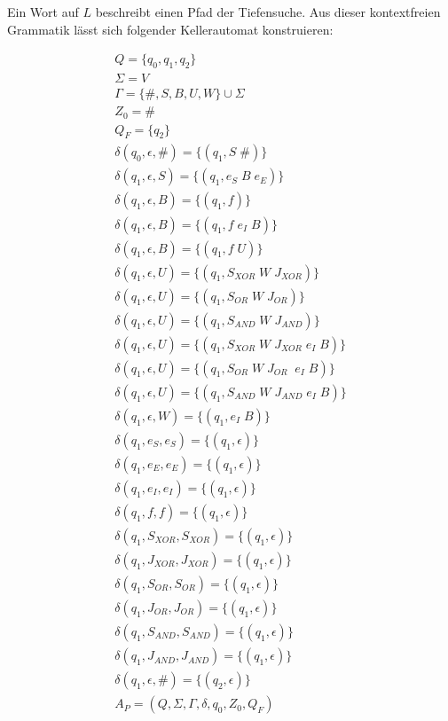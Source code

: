 \noindent Ein Wort auf $L$ beschreibt einen Pfad der Tiefensuche.
Aus dieser kontextfreien Grammatik lässt sich folgender Kellerautomat konstruieren: \cite{hopcroft_einfuhrung_nodate}

\begin{align}
    Q = \{q_0, q_1, q_2\} \\
    \Sigma =  V\\
    \Gamma = \{\#, S, B, U, W\} \cup \Sigma \\
    Z_0 = \# \\
    Q_F = \{q_2\} \\
    \delta(q_0, \epsilon, \#) = \{(q_1, S\; \#)\} \\
    \delta(q_1, \epsilon, S) = \{(q_1, e_S\; B\; e_E)\} \\
    \delta(q_1, \epsilon, B) = \{(q_1, f)\} \\
    \delta(q_1, \epsilon, B) = \{(q_1, f\; e_I \; B)\} \\
    \delta(q_1, \epsilon, B) = \{(q_1, f\; U)\} \\
    \delta(q_1, \epsilon, U) = \{(q_1, S_{XOR}\; W\; J_{XOR})\} \\
    \delta(q_1, \epsilon, U) = \{(q_1, S_{OR}\; W\; J_{OR})\} \\
    \delta(q_1, \epsilon, U) = \{(q_1, S_{AND}\; W\; J_{AND})\} \\
    \delta(q_1, \epsilon, U) = \{(q_1, S_{XOR}\; W\; J_{XOR}\; e_I \; B)\} \\
    \delta(q_1, \epsilon, U) = \{(q_1, S_{OR}\; W\; J_{OR}\; \; e_I \; B)\} \\
    \delta(q_1, \epsilon, U) = \{(q_1, S_{AND}\; W\; J_{AND}\; e_I \; B)\} \\
    \delta(q_1, \epsilon, W) = \{(q_1, e_I\; B)\} \\
    \delta(q_1, e_S, e_S) = \{(q_1, \epsilon)\} \\
    \delta(q_1, e_E, e_E) = \{(q_1, \epsilon)\} \\
    \delta(q_1, e_I, e_I) = \{(q_1, \epsilon)\} \\
    \delta(q_1, f, f) = \{(q_1, \epsilon)\} \\
    \delta(q_1, S_{XOR}, S_{XOR}) = \{(q_1, \epsilon)\} \\
    \delta(q_1, J_{XOR}, J_{XOR}) = \{(q_1, \epsilon)\} \\
    \delta(q_1, S_{OR}, S_{OR}) = \{(q_1, \epsilon)\} \\
    \delta(q_1, J_{OR}, J_{OR}) = \{(q_1, \epsilon)\} \\
    \delta(q_1, S_{AND}, S_{AND}) = \{(q_1, \epsilon)\} \\
    \delta(q_1, J_{AND}, J_{AND}) = \{(q_1, \epsilon)\} \\
    \delta(q_1, \epsilon, \#) = \{(q_2, \epsilon)\} \\
    A_P = (Q, \Sigma, \Gamma, \delta, q_0, Z_0, Q_F)
\end{align}


